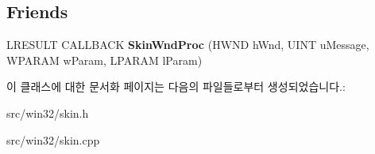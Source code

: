 \subsection*{Friends}
\begin{DoxyCompactItemize}
\item 
\mbox{\label{class_c_skin_ac58ecd226acd172d4941912f99e2cb12}} 
L\+R\+E\+S\+U\+LT C\+A\+L\+L\+B\+A\+CK {\bfseries Skin\+Wnd\+Proc} (H\+W\+ND h\+Wnd, U\+I\+NT u\+Message, W\+P\+A\+R\+AM w\+Param, L\+P\+A\+R\+AM l\+Param)
\end{DoxyCompactItemize}


이 클래스에 대한 문서화 페이지는 다음의 파일들로부터 생성되었습니다.\+:\begin{DoxyCompactItemize}
\item 
src/win32/skin.\+h\item 
src/win32/skin.\+cpp\end{DoxyCompactItemize}
